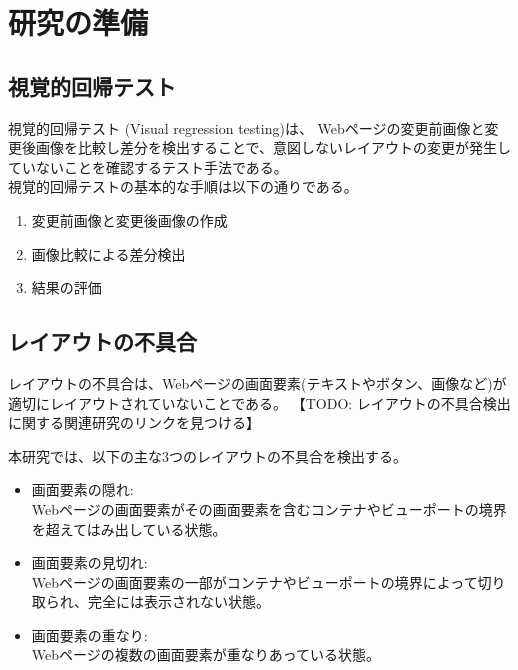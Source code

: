 \chapter{研究の準備}\label{cha:Preparation}

\section{視覚的回帰テスト}\label{sec:vrt}
視覚的回帰テスト (Visual regression testing)\cite{Visual regression testing}は、
Webページの変更前画像と変更後画像を比較し差分を検出することで、意図しないレイアウトの変更が発生していないことを確認するテスト手法である。\\
視覚的回帰テストの基本的な手順は以下の通りである。
\begin{enumerate}
    \setlength{\itemsep}{0pt}
          \setlength{\parsep}{0pt}
    \item 変更前画像と変更後画像の作成
    \item 画像比較による差分検出
    \item 結果の評価
\end{enumerate}

\section{レイアウトの不具合}\label{sec:layout effect}
レイアウトの不具合は、Webページの画面要素(テキストやボタン、画像など)が適切にレイアウトされていないことである。
【TODO: レイアウトの不具合検出に関する関連研究のリンクを見つける】
\par
本研究では、以下の主な3つのレイアウトの不具合を検出する。
\begin{itemize}
    \setlength{\itemsep}{0pt}
          \setlength{\parsep}{0pt}
    \item 画面要素の隠れ:\\
          Webページの画面要素がその画面要素を含むコンテナやビューポートの境界を超えてはみ出している状態。
    \item 画面要素の見切れ:\\
          Webページの画面要素の一部がコンテナやビューポートの境界によって切り取られ、完全には表示されない状態。
    \item 画面要素の重なり:\\
          Webページの複数の画面要素が重なりあっている状態。
\end{itemize}

